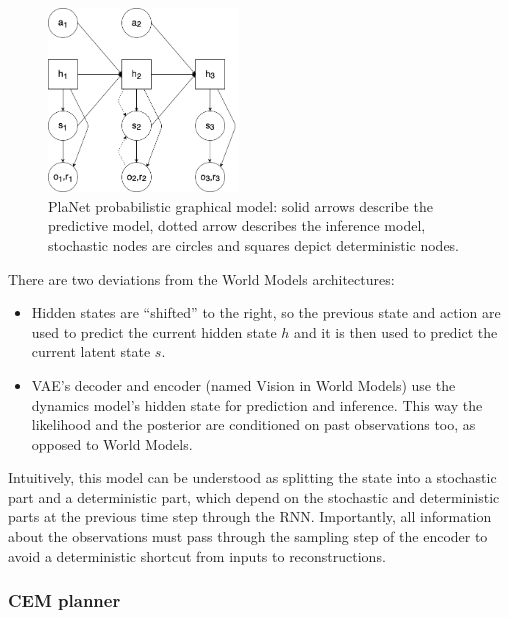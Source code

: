 \begin{figure}[H]
\includegraphics[width=0.45\textwidth,keepaspectratio]{figures/PlaNet/prob_graph_model.png}
\caption[World Models probabilistic graphical model]{PlaNet probabilistic graphical model: solid arrows describe the predictive model, dotted arrow describes the inference model, stochastic nodes are circles and squares depict deterministic nodes.}
\label{Fig.PlaNetPGM}
\end{figure}

\noindent There are two deviations from the World Models architectures:
\begin{itemize}
\item Hidden states are ``shifted'' to the right, so the previous state and action are used to predict the current hidden state $h$ and it is then used to predict the current latent state $s$.
\item VAE's decoder and encoder (named Vision in World Models) use the dynamics model's hidden state for prediction and inference. This way the likelihood and the posterior are conditioned on past observations too, as opposed to World Models.
\end{itemize}

Intuitively, this model can be understood as splitting the state into a stochastic part and a deterministic part, which depend on the stochastic and deterministic parts at the previous time step through the RNN. Importantly, all information about the observations must pass through the sampling step of the encoder to avoid a deterministic shortcut from inputs to reconstructions.

\subsubsection{CEM planner}

